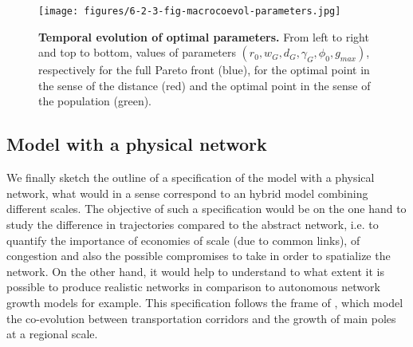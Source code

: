 \begin{figure}
	\texttt{[image: figures/6-2-3-fig-macrocoevol-parameters.jpg]}
	\caption[Evolution of calibrated parameters]{\textbf{Temporal evolution of optimal parameters.} From left to right and top to bottom, values of parameters $(r_0,w_G,d_G,\gamma_G,\phi_0,g_{max})$, respectively for the full Pareto front (blue), for the optimal point in the sense of the distance (red) and the optimal point in the sense of the population (green). \label{fig:macrocoevol:parameters}}
\end{figure}


\subsection{Model with a physical network}


We finally sketch the outline of a specification of the model with a physical network, what would in a sense correspond to an hybrid model combining different scales. The objective of such a specification would be on the one hand to study the difference in trajectories compared to the abstract network, i.e. to quantify the importance of economies of scale (due to common links), of congestion and also the possible compromises to take in order to spatialize the network. On the other hand, it would help to understand to what extent it is possible to produce realistic networks in comparison to autonomous network growth models  for example. This specification follows the frame of \cite{li2014modeling}, which model the co-evolution between transportation corridors and the growth of main poles at a regional scale. 



